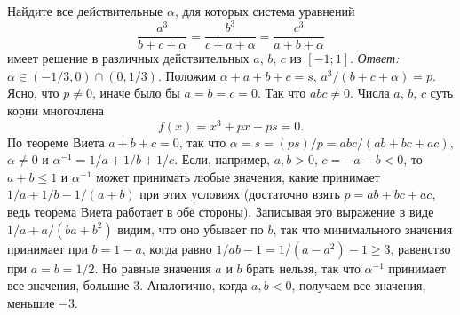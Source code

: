 \problem
Найдите все действительные $\alpha$, для которых система уравнений
\[
    \frac{a^3}{b + c + \alpha}
=
    \frac{b^3}{c + a + \alpha}
=
    \frac{c^3}{a + b + \alpha}
\]
имеет решение в различных действительных $a$, $b$, $c$ из $[-1; 1]$.
\solution
\emph{Ответ:} $\alpha \in (-1/3, 0) \cap (0, 1/3)$.
Положим $\alpha + a + b + c = s$, $a^3 / (b + c + \alpha) = p$.
Ясно, что $p \ne 0$, иначе было бы $a = b = c = 0$.
Так что $a b c \ne 0$.
Числа $a$, $b$, $c$ суть корни многочлена \[f(x)=x^3+px-ps=0.\]
По теореме Виета $a + b + c = 0$, так что
$\alpha = s = (p s) / p = a b c / (a b + b c + a c)$,
$\alpha \ne 0$
и
$\alpha^{-1} = 1 / a + 1 / b + 1 / c$.
Если, например, $a, b > 0$, $c = -a - b < 0$, то
$a + b \leq 1$ и $\alpha^{-1}$
может принимать любые значения, какие принимает
$1 / a + 1 / b - 1 / (a + b)$
при этих условиях
(достаточно взять $p = a b + b c + a c$, ведь теорема Виета работает в обе
стороны).
Записывая это выражение в виде $1 / a + a / (b a + b^2)$ видим, что оно убывает
по $b$, так что минимального значения принимает при $b = 1 - a$, когда равно
$1 / a b - 1 = 1 / (a - a^2) - 1 \geq 3$, равенство при $a = b = 1 / 2$.
Но равные значения $a$ и $b$ брать нельзя, так что $\alpha^{-1}$ принимает все
значения, большие $3$.
Аналогично, когда $a, b < 0$, получаем все значения, меньшие $-3$.
\endproblem
